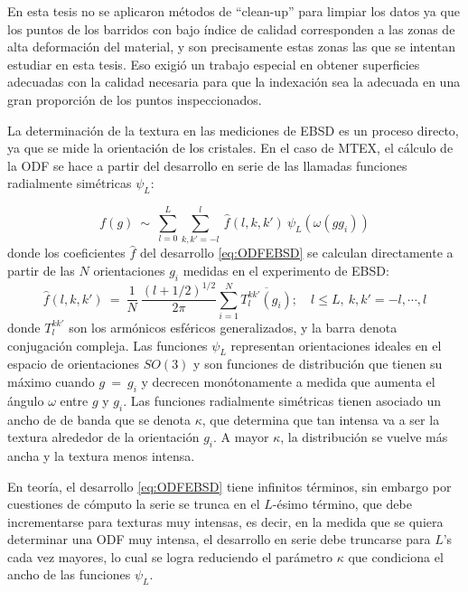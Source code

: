 En esta tesis no se aplicaron métodos de “clean-up” para limpiar los datos ya que los puntos de los barridos con bajo índice de calidad corresponden a las zonas de alta deformación del material, y son precisamente estas zonas las que se intentan estudiar en esta tesis. 
Eso exigió un trabajo especial en obtener superficies adecuadas con la calidad necesaria para que la indexación sea la adecuada en una gran proporción de los puntos inspeccionados.

La determinación de la textura en las mediciones de EBSD es un proceso directo, ya que se mide la orientación de los cristales.
En el caso de MTEX, el cálculo de la ODF se hace a partir del desarrollo en serie de las llamadas funciones radialmente simétricas $\psi_L$:

\begin{equation}
  f(g) \ \sim \ \sum_{l=0}^{L} \sum_{k,k'=-l}^{l} \ \hat{f}(l, k, k') \ \psi_L(\omega(gg_i)) 
  \label{eq:ODFEBSD}
\end{equation}
\noindent
donde los coeficientes $\hat{f}$ del desarrollo \ref{eq:ODFEBSD} se calculan directamente a partir de las $N$ orientaciones $g_i$ medidas en el experimento de EBSD:
\begin{equation}
  \hat{f}(l, k, k') \ = \ \frac{1}{N} \ \frac{(l + 1/2)^{1/2}}{2 \pi} \sum_{i=1}^{N} \overline{T_l^{k k'} (g_i)}; \quad l \leq L, \ k, k' = -l, \cdots, l
  \label{eq:ODFcoef}
\end{equation}
\noindent
donde $T_l^{k k'}$ son los armónicos esféricos generalizados, y la barra denota conjugación compleja. Las funciones $\psi_L$ representan orientaciones ideales en el espacio de orientaciones $SO(3)$ y son funciones de distribución que tienen su máximo cuando $g \ = \ g_i$ y decrecen monótonamente a medida que aumenta el ángulo $\omega$ entre $g$ y $g_i$.
Las funciones radialmente simétricas tienen asociado un ancho de de banda que se denota $\kappa$, que determina que tan intensa va a ser la textura alrededor de la orientación $g_i$.
A mayor $\kappa$, la distribución se vuelve más ancha y la textura menos intensa.

En teoría, el desarrollo \ref{eq:ODFEBSD} tiene infinitos términos, sin embargo por cuestiones de cómputo la serie se trunca en el $L$-ésimo término, que debe incrementarse para texturas muy intensas, es decir, en la medida que se quiera determinar una ODF muy intensa, el desarrollo en serie debe truncarse para $L$'s cada vez mayores, lo cual se logra reduciendo el parámetro $\kappa$ que condiciona el ancho de las funciones $\psi_L$.


